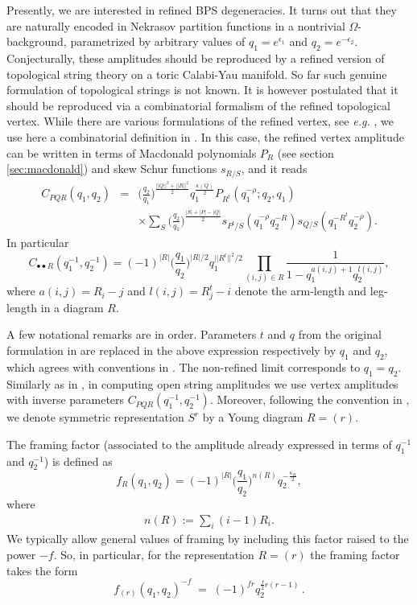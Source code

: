 \documentclass[hyper,letterpaper]{JHEP3}
\newcommand{\bea}{\begin{eqnarray}}
\newcommand{\eea}{\end{eqnarray}}
\newcommand{\be}{\begin{equation}}
\newcommand{\ee}{\end{equation}}
\begin{document}
Presently, we are interested in refined BPS degeneracies.
It turns out that they are naturally encoded in Nekrasov partition functions in a nontrivial $\Omega$-background,
parametrized by arbitrary values of $q_1 = e^{\epsilon_1}$ and $q_2 = e^{-\epsilon_2}$.
Conjecturally, these amplitudes should be reproduced by a refined version of topological string theory on a toric Calabi-Yau manifold.
So far such genuine formulation of topological strings is not known.
It is however postulated that it should be reproduced via a combinatorial formalism of the refined topological vertex.
While there are various formulations of the refined vertex, see {\it e.g.} \cite{Awata:2005fa},
we use here a combinatorial definition in \cite{Iqbal:2007ii}.
In this case, the refined vertex amplitude can be written in terms of Macdonald polynomials $P_R$ (see section \ref{sec:macdonald})
and skew Schur functions $s_{R/S}$, and it reads
\bea
C_{PQR}(q_1,q_2) & = & \Big( \frac{q_2}{q_1} \Big)^{\frac{||Q||^2 + ||R||^2}{2}} q_1^{\frac{\kappa(Q)}{2}} P_{R^t}(q_1^{-\rho};q_2,q_1)  \\
& & \times
\sum_S \Big( \frac{q_2}{q_1} \Big)^{\frac{|S|+|P|-|Q|}{2}} s_{P^t /S} (q_1^{-\rho} q_2^{-R}) s_{Q/S}(q_1^{-R^t} q_2^{-\rho}).  \nonumber
\eea
In particular
\be
C_{\bullet\bullet R}(q_1^{-1},q_2^{-1}) = (-1)^{|R|} \Big( \frac{q_1}{q_2} \Big)^{|R|/2}  q_1^{||R^t||^2/2} \prod_{(i,j) \in R} \frac{1}{1 - q_1^{a(i,j)+1} q_2^{l(i,j)}}  , \label{C00R}
\ee
where $a(i,j)=R_i-j$ and $l(i,j)=R^t_j-i$ denote the arm-length and leg-length in a diagram $R$.

A few notational remarks are in order. Parameters $t$ and $q$ from the original formulation in \cite{Iqbal:2007ii} are replaced in the above expression respectively by $q_1$ and $q_2$, which agrees with conventions in \cite{GIKV,GS}. The non-refined limit corresponds to $q_1=q_2$. Similarly as in \cite{Iqbal:2007ii}, in computing open string amplitudes we use vertex amplitudes with inverse parameters $C_{PQR}(q_1^{-1},q_2^{-1})$. Moreover, following the convention in \cite{GIKV}, we denote symmetric representation $S^r$ by a Young diagram $R=(r)$. %

The framing factor (associated to the amplitude already expressed in terms of $q_1^{-1}$ and $q_2^{-1}$) is defined as
\be
f_{R}(q_1,q_2) = (-1)^{|R|}\Big( \frac{q_1}{q_2} \Big)^{n(R)} q_2^{-\frac{\kappa_R}{2}},
\ee
where
\begin{eqnarray}
n(R):=\sum_i(i-1)R_i.
\end{eqnarray}
We typically allow general values of framing by including this factor raised to the power $-f$.
So, in particular, for the representation $R=(r)$ the framing factor takes the form
$$
f_{(r)}(q_1,q_2)^{-f} \; = \; (-1)^{f r} q_2^{\frac{f}{2} r(r-1)} \,.
$$
\end{document}
